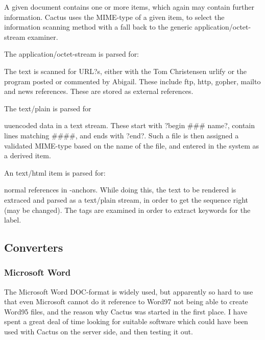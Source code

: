 A given document contains one or more items, which again may contain
further information.  Cactus uses the MIME-type of a given item, to
select the information scanning method with a fall back to the generic
application/octet-stream examiner.

The application/octet-stream is parsed for:

The text is scanned for URL?s, either with the Tom Christensen urlify
or the program posted or commented by Abigail.  These include ftp,
http, gopher, mailto and news references.  These are stored as
external references.

The text/plain is parsed for

uuencoded data in a text stream.  These start with ?begin \#\#\#
name?, contain lines matching \#\#\#\#, and ends with ?end?.  Such a
file is then assigned a validated MIME-type based on the name of the
file, and entered in the system as a derived item.

An text/html item is parsed for:

normal references in -anchors.  While doing this, the text to
be rendered is extraced and parsed as a text/plain stream, in order to
get the sequence right (may be changed).  The  tags are
examined in order to extract keywords for the label.



\subsection{Converters}
\label{sec:converters}


\subsubsection{Microsoft Word}

The Microsoft Word DOC-format is widely used, but apparently so hard
to use that even Microsoft cannot do it \textsf{reference to Word97
  not being able to create Word95 files}, and the reason why Cactus
was started in the first place.  I have spent a great deal of time
looking for suitable software which could have been used with Cactus
on the server side, and then testing it out.

